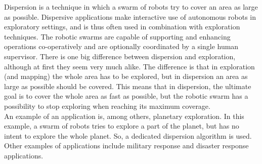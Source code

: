 
Dispersion is a technique in which a swarm of robots try to cover an area as large as possible.  
Dispersive applications make interactive use of autonomous robots in exploratory settings, and is thus often used in combination with exploration techniques. 
The robotic swarms are capable of supporting and enhancing operations co-operatively and are optionally coordinated by a single human supervisor. 
There is one big difference between dispersion and exploration, although at first they seem very much alike. 
The difference is that in exploration (and mapping) the whole area has to be explored, but in dispersion an area as large as possible should be covered. 
This means that in dispersion, the ultimate goal is to cover the whole area as fast as possible, but the robotic swarm has a possibility to stop exploring when reaching its maximum coverage. \\

An example of an application is, among others, planetary exploration. \cite{ludwig2006robotic,Penders2011}
In this example, a swarm of robots tries to explore a part of the planet, but has no intent to explore the whole planet. 
So, a dedicated dispersion algorithm is used. 
Other examples of applications include military response and disaster response applications. 

    

